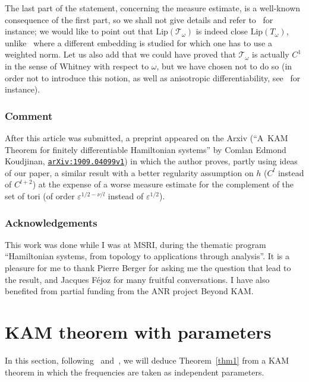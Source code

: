 \documentclass[JEP,XML,SOM,Unicode]{cedram}
\let\mathcal\mathscr
\providecommand{\eprint}[1]{\href{http://arxiv.org/abs/#1}{\texttt{arXiv\string:\allowbreak#1}}}
\numberwithin{equation}{section}
\theoremstyle{plain}
\theoremstyle{definition}
\begin{document}
The last part of the statement, concerning the measure estimate, is a well-known consequence of the first part, so we shall not give details and refer to~\cite{Pos01} for instance; we would like to point out that $\mathrm{Lip}(\mathcal{T}_\omega)$ is indeed close $\mathrm{Lip}(T_\omega)$, unlike~\cite{Pos01} where a different embedding is studied for which one has to use a weighted norm. Let us also add that we could have proved that $\mathcal{T}_\omega$ is actually $C^1$ in the sense of Whitney with respect to $\omega$, but we have chosen not to do so (in order not to introduce this notion, as well as anisotropic differentiability, see~\cite{Pos82} for instance).

\subsubsection*{Comment} After this article was submitted, a preprint appeared on the Arxiv (``A~KAM Theorem for finitely differentiable Hamiltonian systems'' by Comlan Edmond Koudjinan, \eprint{1909.04099v1}) in which the author proves, partly using ideas of our paper, a similar result with a better regularity assumption on $h$ ($C^l$ instead of $C^{l+2}$) at the expense of a worse measure estimate for the complement of the set of tori (of order $\varepsilon^{1/2-\nu/l}$ instead of $\varepsilon^{1/2}$).

\subsubsection*{Acknowledgements} This work was done while I was at MSRI, during the thematic program ``Hamiltonian systems, from topology to applications through analysis''. It is a pleasure for me to thank Pierre Berger for asking me the question that lead to the result, and Jacques Féjoz for many fruitful conversations. I have also benefited from partial funding from the ANR project Beyond KAM.

\section{KAM theorem with parameters}\label{s2}

In this section, following~\cite{Pos01} and~\cite{Pop04}, we will deduce Theorem~\ref{thm1} from a KAM theorem in which the frequencies are taken as independent parameters.
\end{document}
